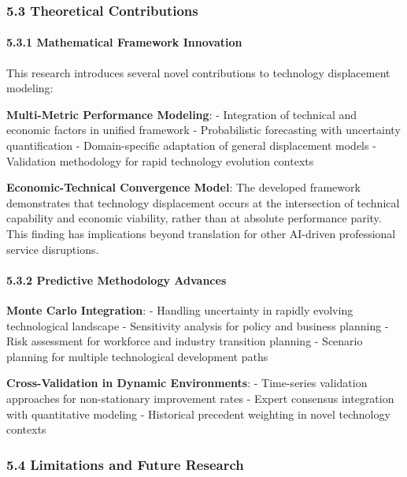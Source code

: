 \documentclass[12pt,a4paper]{article}
\begin{document}
{{{{{\subsubsection{5.3 Theoretical
Contributions}\label{theoretical-contributions}}

\hypertarget{mathematical-framework-innovation}{%
\paragraph{5.3.1 Mathematical Framework
Innovation}\label{mathematical-framework-innovation}}

This research introduces several novel contributions to technology
displacement modeling:

\textbf{Multi-Metric Performance Modeling}: - Integration of technical
and economic factors in unified framework - Probabilistic forecasting
with uncertainty quantification - Domain-specific adaptation of general
displacement models - Validation methodology for rapid technology
evolution contexts

\textbf{Economic-Technical Convergence Model}: The developed framework
demonstrates that technology displacement occurs at the intersection of
technical capability and economic viability, rather than at absolute
performance parity. This finding has implications beyond translation for
other AI-driven professional service disruptions.

\hypertarget{predictive-methodology-advances}{%
\paragraph{5.3.2 Predictive Methodology
Advances}\label{predictive-methodology-advances}}

\textbf{Monte Carlo Integration}: - Handling uncertainty in rapidly
evolving technological landscape - Sensitivity analysis for policy and
business planning - Risk assessment for workforce and industry
transition planning - Scenario planning for multiple technological
development paths

\textbf{Cross-Validation in Dynamic Environments}: - Time-series
validation approaches for non-stationary improvement rates - Expert
consensus integration with quantitative modeling - Historical precedent
weighting in novel technology contexts

\hypertarget{limitations-and-future-research}{%
\subsubsection{5.4 Limitations and Future
Research}\label{limitations-and-future-research}}

}}}}
\end{document}
